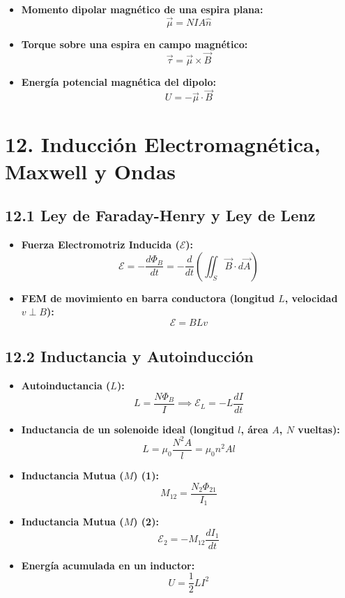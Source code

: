 \documentclass[11pt,a4paper]{article}
\begin{document}
\begin{itemize}
  \item \textbf{Momento dipolar magnético de una espira plana:}
  \[
    \vec{\mu} = N I A \hat{n}
  \]
  \item \textbf{Torque sobre una espira en campo magnético:}
  \[
    \vec{\tau} = \vec{\mu} \times \vec{B}
  \]
  \item \textbf{Energía potencial magnética del dipolo:}
  \[
    U = -\vec{\mu} \cdot \vec{B}
  \]
\end{itemize}

\section*{12. Inducción Electromagnética, Maxwell y Ondas}

\subsection*{12.1 Ley de Faraday-Henry y Ley de Lenz}

\begin{itemize}
  \item \textbf{Fuerza Electromotriz Inducida ($\mathcal{E}$):}
  \[
    \mathcal{E} = -\frac{d\Phi_B}{dt} = -\frac{d}{dt}\left( \iint_S \vec{B} \cdot d\vec{A} \right)
  \]
  \item \textbf{FEM de movimiento en barra conductora (longitud $L$, velocidad $v \perp B$):}
  \[
    \mathcal{E} = B L v
  \]
\end{itemize}

\subsection*{12.2 Inductancia y Autoinducción}

\begin{itemize}
  \item \textbf{Autoinductancia ($L$):}
  \[
    L = \frac{N \Phi_B}{I} \implies \mathcal{E}_L = -L \frac{dI}{dt}
  \]
  \item \textbf{Inductancia de un solenoide ideal (longitud $l$, área $A$, $N$ vueltas):}
  \[
    L = \mu_0 \frac{N^2 A}{l} = \mu_0 n^2 A l
  \]
  \item \textbf{Inductancia Mutua ($M$) (1):}
  \[
    M_{12} = \frac{N_2 \Phi_{21}}{I_1}
  \]
  \item \textbf{Inductancia Mutua ($M$) (2):}
  \[
    \mathcal{E}_2 = -M_{12} \frac{dI_1}{dt}
  \]
  \item \textbf{Energía acumulada en un inductor:}
  \[
    U = \frac{1}{2} L I^2
  \]
\end{itemize}
\end{document}
